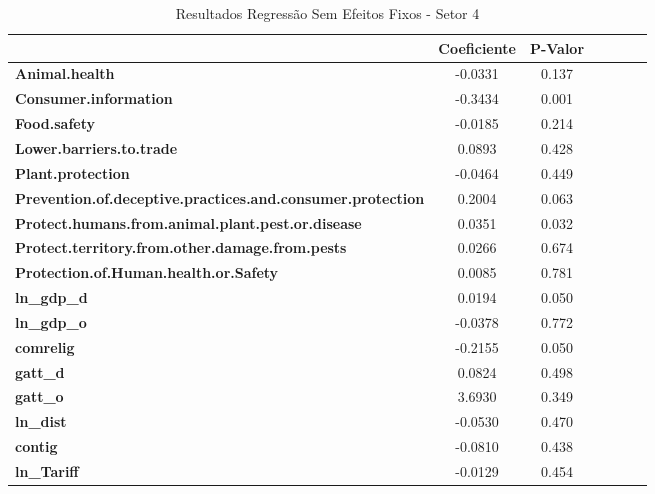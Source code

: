 \begin{table}[ht]
\begin{center}
\begin{tabular}{lcccccc}
        & \textbf{Coeficiente} & \textbf{P-Valor}\\
        \midrule
\textbf{Animal.health}                                             &      -0.0331 &         0.137\\
\textbf{Consumer.information}                                      &      -0.3434 &         0.001\\
\textbf{Food.safety}                                               &      -0.0185 &         0.214\\
\textbf{Lower.barriers.to.trade}                                   &       0.0893 &         0.428\\
\textbf{Plant.protection}                                          &      -0.0464 &         0.449\\
\textbf{Prevention.of.deceptive.practices.and.consumer.protection} &       0.2004 &         0.063\\
\textbf{Protect.humans.from.animal.plant.pest.or.disease}          &       0.0351 &         0.032\\
\textbf{Protect.territory.from.other.damage.from.pests}            &       0.0266 &         0.674\\
\textbf{Protection.of.Human.health.or.Safety}                      &       0.0085 &         0.781\\
\textbf{ln\_gdp\_d}                                                &       0.0194 &         0.050\\
\textbf{ln\_gdp\_o}                                                &      -0.0378 &         0.772\\
\textbf{comrelig}                                                  &      -0.2155 &         0.050\\
\textbf{gatt\_d}                                                   &       0.0824 &         0.498\\
\textbf{gatt\_o}                                                   &       3.6930 &         0.349\\
\textbf{ln\_dist}                                                  &      -0.0530 &         0.470\\
\textbf{contig}                                                    &      -0.0810 &         0.438\\
\textbf{ln\_Tariff}                                                &      -0.0129 &         0.454\\
\bottomrule
\end{tabular}
\caption{Resultados Regressão Sem Efeitos Fixos - Setor 4}
\end{center}
\end{table}